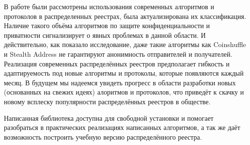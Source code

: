 В работе были рассмотрены использования современных алгоритмов и протоколов в
распределенных реестрах, была актуализирована их классификация. Наличие такого
объёма алгоритмов по защите конфиденциальности и приватности сигнализирует о
явных проблемах в данной области. И действительно, как показало исследование,
даже такие алгоритмы как Coinshuffle и Stealth Address не гарантируют
анонимность отправителей и получателей. Реализация современных распределённых
реестров предполагает гибкость и адаптируемость под новые алгоритмы и
протоколы, которые появляются каждый месяц. В будущем мы надеемся увидеть
прогресс в области разработки новых (основанных на свежих идеях) алоритмов и
протоколов, что приведёт к скачку и новому всплеску популярности распределённых
реестров в обществе.

Написанная библиотека доступна для свободной установки и помогает разобраться в
практических реализациях написанных алгоритмов, а так же даёт возможность
построить учебную версию распределённого реестра. %
